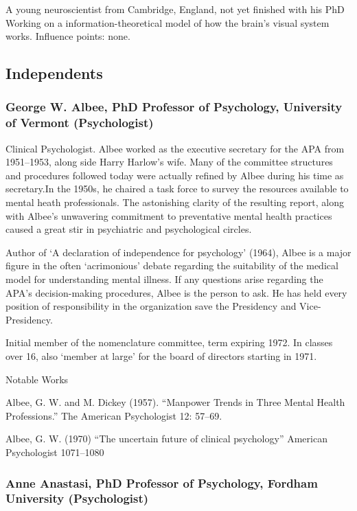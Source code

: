 A young neuroscientist from Cambridge, England, not yet finished with his PhD Working on a information-theoretical model of how the brain's visual system works.
Influence points: none.

\subsection{Independents}
\label{independents}

\subsubsection{George W. Albee, PhD Professor of Psychology, University of Vermont (Psychologist)}
\label{georgew.albeephdprofessorofpsychologyuniversityofvermontpsychologist}

Clinical Psychologist. Albee worked as the executive secretary for the APA from 1951--1953, along side Harry Harlow's wife. Many of the committee structures and procedures followed today were actually refined by Albee during his time as secretary.In the 1950s, he chaired a task force to survey the resources available to mental heath professionals. The astonishing clarity of the resulting report, along with Albee's unwavering commitment to preventative mental health practices caused a great stir in psychiatric and psychological circles.

Author of `A declaration of independence for psychology' (1964), Albee is a major figure in the often `acrimonious' debate regarding the suitability of the medical model for understanding mental illness. If any questions arise regarding the APA's decision-making procedures, Albee is the person to ask. He has held every position of responsibility in the organization save the Presidency and Vice-Presidency.

Initial member of the nomenclature committee, term expiring 1972. In classes over 16, also `member at large' for the board of directors starting in 1971.

Notable Works

Albee, G. W. and M. Dickey (1957). ``Manpower Trends in Three Mental Health Professions.'' The American Psychologist 12: 57--69.

Albee, G. W. (1970) “The uncertain future of clinical psychology” American Psychologist 1071--1080

\subsubsection{Anne Anastasi, PhD Professor of Psychology, Fordham University (Psychologist)}
\label{anneanastasiphdprofessorofpsychologyfordhamuniversitypsychologist}

